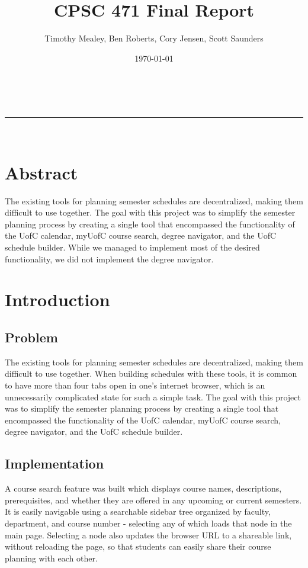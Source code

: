 \documentclass[twoside=false,a4paper,11pt]{article}
\makeatletter
\newcommand{\linia}{\rule{\linewidth}{0.5pt}}
\theoremstyle{mytheor}
\renewcommand{\maketitle}{
\begin{center}
\vspace{2ex}
{\huge \textsc{\@title}}
\vspace{1ex}
\\
\linia\\
\@author \hfill \@date
\vspace{4ex}
\end{center}
}
\makeatother
\begin{document}
\title{CPSC 471 Final Report}
\author{Timothy Mealey, Ben Roberts, Cory Jensen, Scott Saunders}
\date{\today}
\maketitle

\section*{Abstract}

The existing tools for planning semester schedules are decentralized, making them difficult to use together. The goal with this project was to simplify the semester planning process by creating a single tool that encompassed the functionality of the UofC calendar, myUofC course search, degree navigator, and the UofC schedule builder. While we managed to implement most of the desired functionality, we did not implement the degree navigator.

\section*{Introduction}

\subsection*{Problem}

The existing tools for planning semester schedules are decentralized, making them difficult to use together. When building schedules with these tools, it is common to have more than four tabs open in one's internet browser, which is an unnecessarily complicated state for such a simple task. The goal with this project was to simplify the semester planning process by creating a single tool that encompassed the functionality of the UofC calendar, myUofC course search, degree navigator, and the UofC schedule builder.

\subsection*{Implementation}

A course search feature was built which displays course names, descriptions, prerequisites, and whether they are offered in any upcoming or current semesters. It is easily navigable using a searchable sidebar tree organized by faculty, department, and course number - selecting any of which loads that node in the main page. Selecting a node also updates the browser URL to a shareable link, without reloading the page, so that students can easily share their course planning with each other.
\end{document}

